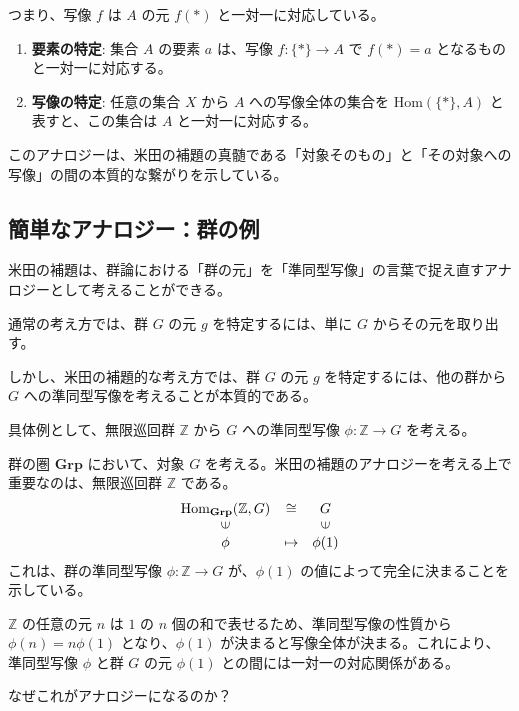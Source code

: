\documentclass[uplatex,a4j,12pt,dvipdfmx]{jsarticle}
\begin{document}
つまり、写像 $f$ は $A$ の元 $f( * )$ と一対一に対応している。

\begin{enumerate}
	\item \textbf{要素の特定}: 集合 $A$ の要素 $a$ は、写像 $f: \{*\} \to A$ で $f(*) = a$ となるものと一対一に対応する。
	\item \textbf{写像の特定}: 任意の集合 $X$ から $A$ への写像全体の集合を $\text{Hom}(\{*\}, A)$ と表すと、この集合は $A$ と一対一に対応する。
\end{enumerate}

このアナロジーは、米田の補題の真髄である「対象そのもの」と「その対象への写像」の間の本質的な繋がりを示している。





\subsection{簡単なアナロジー：群の例}

米田の補題は、群論における「群の元」を「準同型写像」の言葉で捉え直すアナロジーとして考えることができる。

通常の考え方では、群 $G$ の元 $g$ を特定するには、単に $G$ からその元を取り出す。

しかし、米田の補題的な考え方では、群 $G$ の元 $g$ を特定するには、他の群から $G$ への準同型写像を考えることが本質的である。

具体例として、無限巡回群 $\mathbb{Z}$ から $G$ への準同型写像 $\phi: \mathbb{Z} \to G$ を考える。

群の圏 $\mathbf{Grp}$ において、対象 $G$ を考える。米田の補題のアナロジーを考える上で重要なのは、無限巡回群 $\mathbb{Z}$ である。
\[
	\begin{array}{ccc} \text{Hom}_{\mathbf{Grp}}(\mathbb{Z}, G)& \cong & G \\ \rotatebox{90}{${\in}$} && \rotatebox{90}{${\in}$} \\ \phi& \mapsto & \phi(1) \end{array}
\]
これは、群の準同型写像 $\phi: \mathbb{Z} \to G$ が、$\phi(1)$ の値によって完全に決まることを示している。

$\mathbb{Z}$ の任意の元 $n$ は $1$ の $n$ 個の和で表せるため、準同型写像の性質から $\phi(n) = n\phi(1)$ となり、$\phi(1)$ が決まると写像全体が決まる。これにより、準同型写像 $\phi$ と群 $G$ の元 $\phi(1)$ との間には一対一の対応関係がある。

なぜこれがアナロジーになるのか？
\end{document}
